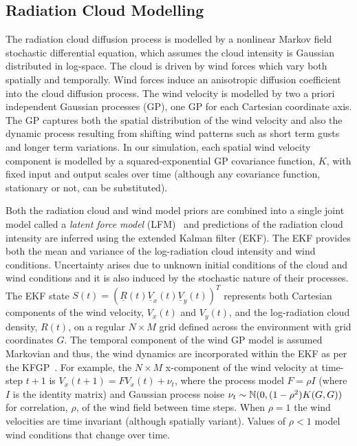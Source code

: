 \subsection{Radiation Cloud Modelling}
The radiation cloud diffusion process is modelled by a nonlinear Markov field stochastic differential equation, which assumes the cloud intensity is Gaussian distributed in log-space.  The cloud is driven by wind forces which vary both spatially and temporally.  Wind forces induce an anisotropic diffusion coefficient into the cloud diffusion process.  The wind velocity is modelled by two a priori independent Gaussian processes (GP), one GP for each Cartesian coordinate axis.  The GP captures both the spatial distribution of the wind velocity and also the dynamic process resulting from shifting wind patterns such as short term gusts and longer term variations.  In our simulation, each spatial wind velocity component is modelled by a squared-exponential GP covariance function, $K$, with fixed input and output scales over time (although any covariance function, stationary or not, can be substituted).

Both the radiation cloud and wind model priors are combined into a single joint model called a {\it latent force model} (LFM)~\cite{alvarez09} and predictions of the radiation cloud intensity are inferred using the extended Kalman filter (EKF).  The EKF provides both the mean and variance of the log-radiation cloud intensity and wind conditions.  Uncertainty arises due to unknown initial conditions of the cloud and wind conditions and it is also induced by the stochastic nature of their processes.  The EKF state $S(t)=(\underline{R}(t) \underline{V}_x(t) \underline{V}_y(t))^T$ represents both Cartesian components of the wind velocity, $V_x(t)$ and $V_y(t)$, and the log-radiation cloud density, $R(t)$, on a regular $N\times M$ grid defined across the environment with grid coordinates $G$.  The temporal component of the wind GP model is assumed Markovian and thus, the wind dynamics are incorporated within the EKF as per the KFGP~\cite{reece10}.  For example, the $N\times M$ x-component of the wind velocity at time-step $t+1$ is $V_x(t+1)=F V_x(t)+\nu_t$, where the process model $F=\rho I$ (where $I$ is the identity matrix) and Gaussian process noise $\nu_t\sim \Bbb{N}(0,(1-\rho^2) K(G,G))$ for correlation, $\rho$, of the wind field between time steps.  When $\rho=1$ the wind velocities are time invariant (although spatially variant).  Values of $\rho<1$ model wind conditions that change over time.

